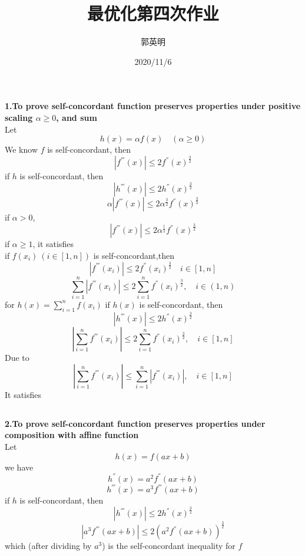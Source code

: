 \documentclass[UTF8]{ctexart}
\title{最优化第四次作业}
\author{郭英明}
\date{2020/11/6}
\begin{document}
\maketitle
\section{}
\subsection{}
\textbf{1.To prove self-concordant function preserves properties under positive scaling $\alpha\geq0$, and sum}\\
Let
$$
  h(x)=\alpha f(x)\quad(\alpha\geq0)
$$
We know $f$ is self-concordant, then
$$
  |f^{'''}(x)|\leq2f^{''}(x)^{\frac{3}{2}}
$$
if $h$ is self-concordant, then
  $$|h^{'''}(x)|\leq2h^{''}(x)^{\frac{3}{2}}$$
  $$\alpha|f^{'''}(x)|\leq2\alpha^{\frac{3}{2}}f^{''}(x)^{\frac{3}{2}}$$
if $\alpha>0$,
  $$|f^{'''}(x)|\leq2\alpha^{\frac{1}{2}}f^{''}(x)^{\frac{3}{2}}$$
if $\alpha\geq1$, it satisfies\\
if $f(x_{i})\ (i \in [1,n])$ is self-concordant,then
  $$|f^{'''}(x_{i})|\leq2f^{''}(x_{i})^{\frac{3}{2}}\quad i\in[1,n]$$
  $$\sum\limits_{i=1}^{n}|f^{'''}(x_{i})|\leq2\sum\limits_{i=1}^{n}f^{''}(x_{i})^{\frac{3}{2}},\quad i\in(1,n)$$
for $h(x)=\sum\limits_{i=1}^{n}f(x_{i})$
if $h(x)$ is self-concordant, then
  $$|h^{'''}(x)|\leq2h^{''}(x)^{\frac{3}{2}}$$
  $$|\sum\limits_{i=1}^{n}f^{'''}(x_{i})|\leq2\sum\limits_{i=1}^{n}f^{''}(x_{i})^{\frac{3}{2}},\quad i\in[1,n]$$
Due to
  $$|\sum\limits_{i=1}^{n}f^{'''}(x_{i})|\leq\sum\limits_{i=1}^{n}|f^{'''}(x_{i})|,\quad i\in[1,n]$$
It satisfies\\

\subsection{}
\textbf{2.To prove self-concordant function preserves properties under composition with affine function}\\
Let
$$h(x)=f(ax+b)$$
we have
  $$h^{''}(x)=a^{2}f^{''}(ax+b)$$
  $$h^{'''}(x)=a^{3}f^{'''}(ax+b)$$
if $h$ is self-concordant, then
  $$|h^{'''}(x)|\leq2h^{''}(x)^{\frac{3}{2}}$$
  $$|a^{3}f^{'''}(ax+b)|\leq 2(a^{2}f^{''}(ax+b))^{\frac{3}{2}}$$
which (after dividing by $a^{3}$) is the self-concordant inequality for $f$\\
\end{document}
